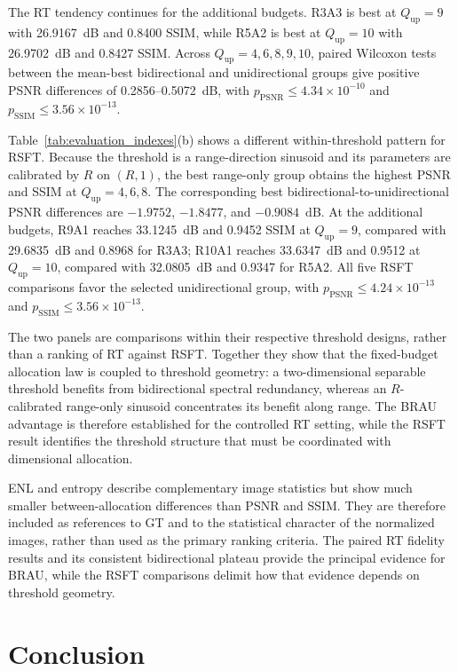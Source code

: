 \documentclass[conference]{IEEEtran}
\begin{document}
The RT tendency continues for the additional budgets. R3A3 is best at $Q_{\mathrm{up}}=9$ with 26.9167~dB and 0.8400 SSIM, while R5A2 is best at $Q_{\mathrm{up}}=10$ with 26.9702~dB and 0.8427 SSIM. Across $Q_{\mathrm{up}}=4,6,8,9,10$, paired Wilcoxon tests between the mean-best bidirectional and unidirectional groups give positive PSNR differences of 0.2856--0.5072~dB, with $p_{\mathrm{PSNR}}\leq4.34\times10^{-10}$ and $p_{\mathrm{SSIM}}\leq3.56\times10^{-13}$.

Table~\ref{tab:evaluation_indexes}(b) shows a different within-threshold pattern for RSFT. Because the threshold is a range-direction sinusoid and its parameters are calibrated by $R$ on $(R,1)$, the best range-only group obtains the highest PSNR and SSIM at $Q_{\mathrm{up}}=4,6,8$. The corresponding best bidirectional-to-unidirectional PSNR differences are $-1.9752$, $-1.8477$, and $-0.9084$~dB. At the additional budgets, R9A1 reaches 33.1245~dB and 0.9452 SSIM at $Q_{\mathrm{up}}=9$, compared with 29.6835~dB and 0.8968 for R3A3; R10A1 reaches 33.6347~dB and 0.9512 at $Q_{\mathrm{up}}=10$, compared with 32.0805~dB and 0.9347 for R5A2. All five RSFT comparisons favor the selected unidirectional group, with $p_{\mathrm{PSNR}}\leq4.24\times10^{-13}$ and $p_{\mathrm{SSIM}}\leq3.56\times10^{-13}$.

The two panels are comparisons within their respective threshold designs, rather than a ranking of RT against RSFT. Together they show that the fixed-budget allocation law is coupled to threshold geometry: a two-dimensional separable threshold benefits from bidirectional spectral redundancy, whereas an $R$-calibrated range-only sinusoid concentrates its benefit along range. The BRAU advantage is therefore established for the controlled RT setting, while the RSFT result identifies the threshold structure that must be coordinated with dimensional allocation.

ENL and entropy describe complementary image statistics but show much smaller between-allocation differences than PSNR and SSIM. They are therefore included as references to GT and to the statistical character of the normalized images, rather than used as the primary ranking criteria. The paired RT fidelity results and its consistent bidirectional plateau provide the principal evidence for BRAU, while the RSFT comparisons delimit how that evidence depends on threshold geometry.

\section{Conclusion}
\end{document}
